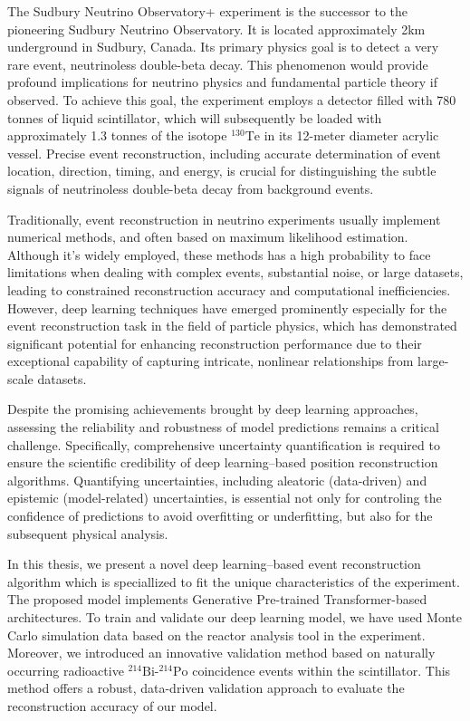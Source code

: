\begin{enabstract}

The Sudbury Neutrino Observatory+ experiment is the successor 
to the pioneering Sudbury 
Neutrino Observatory. It is located approximately 2km 
underground in Sudbury, Canada. Its primary physics goal is 
to detect a very rare event, neutrinoless double-beta 
decay. This phenomenon would provide profound 
implications for neutrino physics and fundamental particle theory 
if observed. To achieve this goal, the experiment employs a 
detector filled with 780 tonnes of liquid scintillator, which 
will subsequently be loaded with approximately 1.3 tonnes of 
the isotope $^{130}\mathrm{Te}$ in its 12-meter diameter acrylic 
vessel. Precise event reconstruction, including accurate 
determination of event location, direction, timing, and energy, 
is crucial for distinguishing the subtle signals of neutrinoless double-beta 
decay from background events.

Traditionally, event reconstruction in neutrino experiments 
usually implement numerical methods, and often based on 
maximum likelihood estimation. 
Although it's widely employed, these methods has a high probability 
to face limitations when dealing with complex events, substantial 
noise, or large datasets, leading to constrained reconstruction 
accuracy and computational inefficiencies. However, 
deep learning techniques have emerged prominently especially for
the event reconstruction task
in the field of particle physics, which has demonstrated significant 
potential for enhancing reconstruction performance due to 
their exceptional capability of capturing intricate, nonlinear 
relationships from large-scale datasets.

Despite the promising achievements brought by deep learning approaches, 
assessing the reliability and robustness of model predictions 
remains a critical challenge. Specifically, comprehensive 
uncertainty quantification is required to ensure the scientific 
credibility of deep learning–based position reconstruction algorithms. 
Quantifying uncertainties, including aleatoric (data-driven) and epistemic (model-related) uncertainties, 
is essential not only for controling the confidence of predictions to avoid overfitting or underfitting, 
but also for the subsequent physical analysis.

In this thesis, we present a novel deep learning–based event 
reconstruction algorithm which is speciallized 
to fit the unique 
characteristics of the experiment. The proposed model 
implements Generative Pre-trained Transformer-based architectures. 
To train and validate our deep learning model, we have used Monte Carlo 
simulation data based on the reactor analysis tool in the experiment.
Moreover, we introduced an innovative validation method based on 
naturally occurring radioactive 
$^{214}\mathrm{Bi}$-$^{214}\mathrm{Po}$ coincidence events within 
the scintillator. This method offers a robust, data-driven 
validation approach to evaluate the reconstruction accuracy of 
our model.


\end{enabstract}
